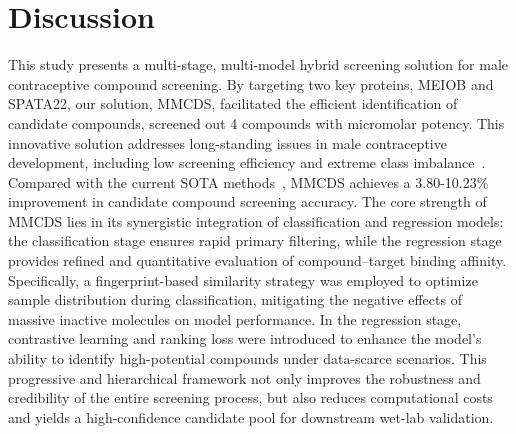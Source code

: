 \documentclass[unnumsec,webpdf,contemporary,large]{oup-authoring-template}%
\theoremstyle{thmstyleone}%
\theoremstyle{thmstyletwo}%
\theoremstyle{thmstylethree}%
\begin{document}
\section*{Discussion}

This study presents a multi-stage, multi-model hybrid screening solution for male contraceptive compound screening. By targeting two key proteins, MEIOB and SPATA22, our solution, MMCDS, facilitated the efficient identification of candidate compounds, screened out 4 compounds with micromolar potency. This innovative solution addresses long-standing issues in male contraceptive development, including low screening efficiency and extreme class imbalance~\cite{54,55,56}. Compared with the current SOTA methods~\cite{57,58}, MMCDS achieves a 3.80-10.23\% improvement in candidate compound screening accuracy. The core strength of MMCDS lies in its synergistic integration of classification and regression models: the classification stage ensures rapid primary filtering, while the regression stage provides refined and quantitative evaluation of compound–target binding affinity. Specifically, a fingerprint-based similarity strategy was employed to optimize sample distribution during classification, mitigating the negative effects of massive inactive molecules on model performance. In the regression stage, contrastive learning and ranking loss were introduced to enhance the model's ability to identify high-potential compounds under data-scarce scenarios. This progressive and hierarchical framework not only improves the robustness and credibility of the entire screening process, but also reduces computational costs and yields a high-confidence candidate pool for downstream wet-lab validation.
\end{document}
